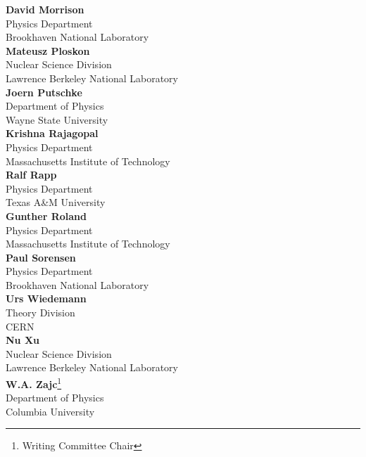 \hfill
\begin{minipage}[t]{0.5\linewidth}

{\bf David Morrison}\\
Physics Department\\
Brookhaven National Laboratory\\

{\bf Mateusz Ploskon}\\
Nuclear Science Division\\
Lawrence Berkeley National Laboratory\\

{\bf Joern Putschke}\\
Department of Physics\\
Wayne State University\\

{\bf Krishna Rajagopal}\\
Physics Department\\
Massachusetts Institute of Technology\\

{\bf Ralf Rapp}\\
Physics Department\\
Texas A\&M University\\

{\bf Gunther Roland}\\
Physics Department\\
Massachusetts Institute of Technology\\

{\bf Paul Sorensen}\\
Physics Department\\
Brookhaven National Laboratory\\

{\bf Urs Wiedemann}\\
Theory Division\\
CERN\\

{\bf Nu Xu}\\
Nuclear Science Division\\
Lawrence Berkeley National Laboratory\\

{\bf W.A. Zajc}\footnote{Writing Committee Chair}\\
Department of Physics\\
Columbia University\\

\end{minipage}




